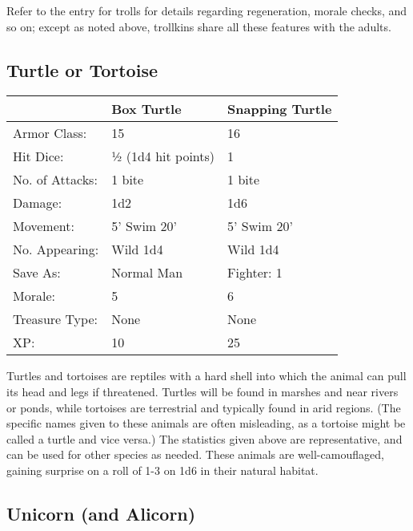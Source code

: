 \documentclass[a4paper,twoside,openany,10pt]{book}
\begin{document}
\begin{multicols}{2}
Refer to the entry for trolls for details regarding regeneration, morale checks, and so on; except as noted above, trollkins share all these features with the adults.

\subsection*{Turtle or Tortoise}\label{turtle-or-tortoise}

\begin{tabularx}{0.50\textwidth}{@{}lXX@{}}
& \textbf{Box Turtle} & \textbf{Snapping Turtle} \\\hline
Armor Class: & 15 & 16 \\\hline
Hit Dice: & ½ (1d4 hit points) & 1 \\\hline
No. of Attacks: & 1 bite & 1 bite \\\hline
Damage: & 1d2 & 1d6 \\\hline
Movement: & 5' Swim 20' &
5' Swim 20' \\\hline
No. Appearing: & Wild 1d4 & Wild 1d4 \\\hline
Save As: & Normal Man & Fighter: 1 \\\hline
Morale: & 5 & 6 \\\hline
Treasure Type: & None & None \\\hline
XP: & 10 & 25 \\\hline
\end{tabularx}\medskip

Turtles and tortoises are reptiles with a hard shell into which the animal can pull its head and legs if threatened. Turtles will be found in marshes and near rivers or ponds, while tortoises are terrestrial and typically found in arid regions. (The specific names given to these animals are often misleading, as a tortoise might be called a turtle and vice versa.) The statistics given above are representative, and can be used for other species as needed. These animals are well-camouflaged, gaining surprise on a roll of 1-3 on 1d6 in their natural habitat.

\subsection*{Unicorn (and Alicorn)}\label{unicorn-and-alicorn}


\end{multicols}
\end{document}
